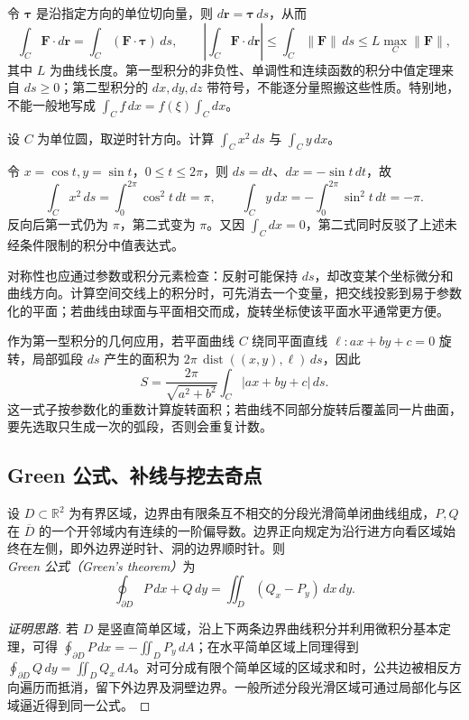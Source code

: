 令 $\boldsymbol\tau$ 是沿指定方向的单位切向量，则 $d\boldsymbol r=\boldsymbol\tau\,ds$，从而
\[
\int_C\boldsymbol F\cdot d\boldsymbol r
=\int_C(\boldsymbol F\cdot\boldsymbol\tau)\,ds,
\qquad
\left|\int_C\boldsymbol F\cdot d\boldsymbol r\right|
\le\int_C\|\boldsymbol F\|\,ds
\le L\max_C\|\boldsymbol F\|,
\]
其中 $L$ 为曲线长度。第一型积分的非负性、单调性和连续函数的积分中值定理来自 $ds\ge0$；第二型积分的 $dx,dy,dz$ 带符号，不能逐分量照搬这些性质。特别地，不能一般地写成 $\int_Cf\,dx=f(\xi)\int_Cdx$。

\begin{example}
\label{ex:pei-line-orientation}
设 $C$ 为单位圆，取逆时针方向。计算 $\int_Cx^2\,ds$ 与 $\int_Cy\,dx$。
\end{example}
\begin{solve}
令 $x=\cos t,y=\sin t$，$0\le t\le2\pi$，则 $ds=dt$、$dx=-\sin t\,dt$，故
\[
\int_Cx^2\,ds=\int_0^{2\pi}\cos^2t\,dt=\pi,
\qquad
\int_Cy\,dx=-\int_0^{2\pi}\sin^2t\,dt=-\pi.
\]
反向后第一式仍为 $\pi$，第二式变为 $\pi$。又因 $\int_Cdx=0$，第二式同时反驳了上述未经条件限制的积分中值表达式。
\end{solve}

对称性也应通过参数或积分元素检查：反射可能保持 $ds$，却改变某个坐标微分和曲线方向。计算空间交线上的积分时，可先消去一个变量，把交线投影到易于参数化的平面；若曲线由球面与平面相交而成，旋转坐标使该平面水平通常更方便。

作为第一型积分的几何应用，若平面曲线 $C$ 绕同平面直线 $\ell:ax+by+c=0$ 旋转，局部弧段 $ds$ 产生的面积为 $2\pi\,\operatorname{dist}((x,y),\ell)\,ds$，因此
\[
S=\frac{2\pi}{\sqrt{a^2+b^2}}\int_C|ax+by+c|\,ds.
\]
这一式子按参数化的重数计算旋转面积；若曲线不同部分旋转后覆盖同一片曲面，要先选取只生成一次的弧段，否则会重复计数。

\subsection{Green 公式、补线与挖去奇点}

\begin{theorem}
\label{thm:pei-green}
设 $D\subset\mathbb R^2$ 为有界区域，边界由有限条互不相交的分段光滑简单闭曲线组成，$P,Q$ 在 $\overline D$ 的一个开邻域内有连续的一阶偏导数。边界正向规定为沿行进方向看区域始终在左侧，即外边界逆时针、洞的边界顺时针。则 \emph{Green 公式（Green's theorem）}为
\begin{equation}
\label{eq:pei-green}
\oint_{\partial D}P\,dx+Q\,dy
=\iint_D(Q_x-P_y)\,dx\,dy.
\end{equation}
\end{theorem}
\begin{proof}[证明思路]
若 $D$ 是竖直简单区域，沿上下两条边界曲线积分并利用微积分基本定理，可得 $\oint_{\partial D}P\,dx=-\iint_DP_y\,dA$；在水平简单区域上同理得到 $\oint_{\partial D}Q\,dy=\iint_DQ_x\,dA$。对可分成有限个简单区域的区域求和时，公共边被相反方向遍历而抵消，留下外边界及洞壁边界。一般所述分段光滑区域可通过局部化与区域逼近得到同一公式。
\end{proof}

